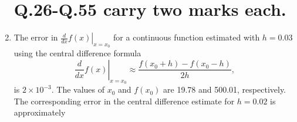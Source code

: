 \documentclass[journal]{IEEEtran}
\numberwithin{equation}{enumi}
\numberwithin{figure}{enumi}
\begin{document}
\begin{enumerate}
\begin{enumerate}
\end{enumerate} 
\section{Q.26-Q.55 carry two marks each.}
\item The error in $\left. \frac{d}{dx} f(x) \right|_{x = x_0}$ for a continuous function estimated with $h = 0.03$ using the central difference formula
\[
\left. \frac{d}{dx} f(x) \right|_{x = x_0} \approx \frac{f(x_0 + h) - f(x_0 - h)}{2h},
\]
is $2 \times 10^{-3}$. The values of $x_0$ and $f(x_0)$ are 19.78 and 500.01, respectively. The corresponding error in the central difference estimate for $h = 0.02$ is approximately
\begin{enumerate}
\end{enumerate}

\end{enumerate}
\end{document}
